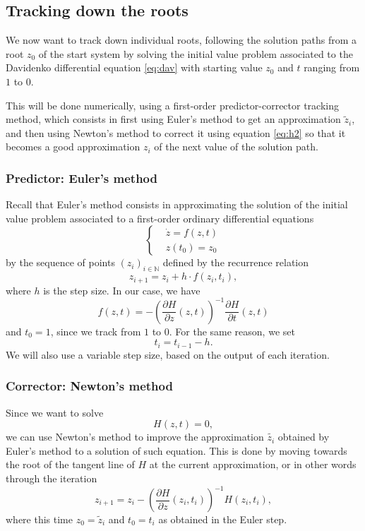 \documentclass[a4paper]{article}
\newcommand{\N}{\mathbb{N}}
\theoremstyle{definition}
\theoremstyle{definition}
\theoremstyle{remark}
\theoremstyle{definition}
\begin{document}
\subsection{Tracking down the roots}
We now want to track down individual roots, following the solution paths from
a root $z_0$ of the start system by solving the initial value problem associated to the Davidenko differential equation \eqref{eq:dav} with starting value $z_0$ and
$t$ ranging from $1$ to $0$.

This will be done numerically, using a first-order predictor-corrector tracking method, which consists in first using Euler's method to get an approximation
$\widetilde{z}_i$, and then using Newton's method to correct it
using equation \eqref{eq:h2} so that it becomes a good approximation $z_i$ of the next value of the solution path.
\subsubsection{Predictor: Euler's method}
Recall that Euler's method consists in approximating the solution of the initial value problem associated to a first-order ordinary differential equations
\begin{equation*}
    \left\{
        \begin{aligned}
            &\dot{z}=f(z,t)\\
            &z(t_0)=z_0
        \end{aligned}
    \right.
\end{equation*}
by the sequence of points $(z_i)_{i\in\N}$ defined by the recurrence relation
$$ z_{i+1}=z_i+h\cdot f(z_i,t_i) ,$$
where $h$ is the step size.
In our case, we have $$f(z,t)=-\left(\frac{\partial H}{\partial z}(z,t)\right)^{-1}\frac{\partial H}{\partial t}(z,t)$$ and $t_0=1$, since we track from $1$ to $0$. For the same
reason, we set $$t_i=t_{i-1}-h.$$ We will also use a variable step size, based on the output of each iteration.
\subsubsection{Corrector: Newton's method}
Since we want to solve $$H(z,t)=0,$$ we can use Newton's method to improve the approximation $\widetilde{z_i}$ obtained by Euler's method to a solution of such equation.
This is done by moving towards the root of the tangent line of $H$ at the current approximation, or in other words through the iteration
$$ z_{i+1}=z_i-\left(\frac{\partial H}{\partial z}(z_i,t_i)\right)^{-1}H(z_i,t_i) ,$$
where this time $z_0=\widetilde{z}_i$ and $t_0=t_i$ as obtained in the Euler step.
\end{document}

